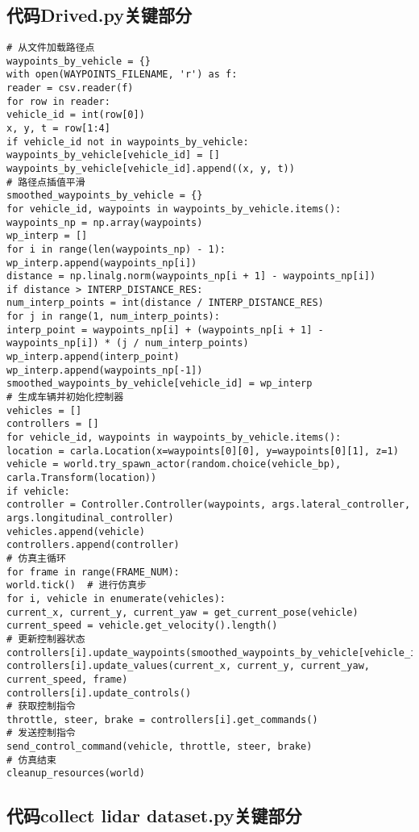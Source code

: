 \chapter{}

\section{代码Drived.py关键部分}
\begin{lstlisting}
# 从文件加载路径点
waypoints_by_vehicle = {}
with open(WAYPOINTS_FILENAME, 'r') as f:
reader = csv.reader(f)
for row in reader:
vehicle_id = int(row[0])
x, y, t = row[1:4]
if vehicle_id not in waypoints_by_vehicle:
waypoints_by_vehicle[vehicle_id] = []
waypoints_by_vehicle[vehicle_id].append((x, y, t))
# 路径点插值平滑
smoothed_waypoints_by_vehicle = {}
for vehicle_id, waypoints in waypoints_by_vehicle.items():
waypoints_np = np.array(waypoints)
wp_interp = []
for i in range(len(waypoints_np) - 1):
wp_interp.append(waypoints_np[i])
distance = np.linalg.norm(waypoints_np[i + 1] - waypoints_np[i])
if distance > INTERP_DISTANCE_RES:
num_interp_points = int(distance / INTERP_DISTANCE_RES)
for j in range(1, num_interp_points):
interp_point = waypoints_np[i] + (waypoints_np[i + 1] - waypoints_np[i]) * (j / num_interp_points)
wp_interp.append(interp_point)
wp_interp.append(waypoints_np[-1])
smoothed_waypoints_by_vehicle[vehicle_id] = wp_interp
# 生成车辆并初始化控制器
vehicles = []
controllers = []
for vehicle_id, waypoints in waypoints_by_vehicle.items():
location = carla.Location(x=waypoints[0][0], y=waypoints[0][1], z=1)
vehicle = world.try_spawn_actor(random.choice(vehicle_bp), carla.Transform(location))
if vehicle:
controller = Controller.Controller(waypoints, args.lateral_controller, args.longitudinal_controller)
vehicles.append(vehicle)
controllers.append(controller)
# 仿真主循环
for frame in range(FRAME_NUM):
world.tick()  # 进行仿真步
for i, vehicle in enumerate(vehicles):
current_x, current_y, current_yaw = get_current_pose(vehicle)
current_speed = vehicle.get_velocity().length()
# 更新控制器状态
controllers[i].update_waypoints(smoothed_waypoints_by_vehicle[vehicle_ids[i]])
controllers[i].update_values(current_x, current_y, current_yaw, current_speed, frame)
controllers[i].update_controls()
# 获取控制指令
throttle, steer, brake = controllers[i].get_commands()
# 发送控制指令
send_control_command(vehicle, throttle, steer, brake)
# 仿真结束
cleanup_resources(world)
\end{lstlisting}

\section{代码collect lidar dataset.py关键部分}


